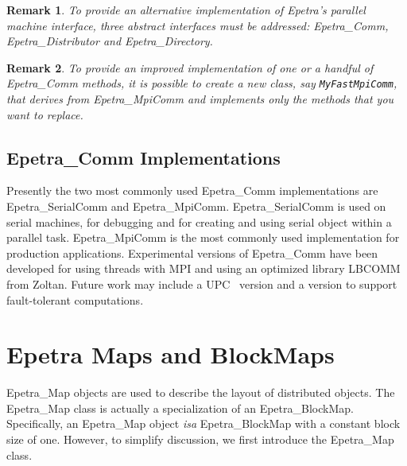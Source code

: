 \documentclass[12pt,relax]{EpetraUserGuide}
\newcommand{\comm}{Epetra\_Comm}
\newcommand{\serialcomm}{Epetra\_SerialComm}
\newcommand{\mpicomm}{Epetra\_MpiComm}
\newcommand{\map}{Epetra\_Map}
\newcommand{\blockmap}{Epetra\_BlockMap}
\newcommand{\distributor}{Epetra\_Distributor}
\newcommand{\directory}{Epetra\_Directory}
\newtheorem{remark}{Remark}
\begin{document}
\begin{remark}
To provide an alternative implementation of Epetra's parallel machine interface,  
three abstract interfaces must be addressed: \comm{}, \distributor{} and \directory.
\end{remark}

\begin{remark}
To provide an improved implementation of one or a handful of \comm{} methods,
it is possible to create a new class, say \verb!MyFastMpiComm!, that derives
from \mpicomm{} and implements only the methods that you want to replace.
\end{remark}

\subsection{\comm{} Implementations}

Presently the two most commonly used \comm{} implementations are \serialcomm{} 
and \mpicomm{}.  \serialcomm{} is used on serial machines, for debugging and for
creating and using serial object within a parallel task.  \mpicomm{} is the most
commonly used implementation for production applications.  Experimental versions
of \comm{} have been developed for using threads with MPI and using an optimized
library LBCOMM from Zoltan.  Future work may include a UPC~\cite{UPC} version and
a version to support fault-tolerant computations.

\section{Epetra Maps and BlockMaps}
\label{Section:maps}

\map{} objects are used to describe the layout of distributed
objects.  The \map{} class is actually a specialization of an
\blockmap{}.  Specifically, an \map{} object {\it isa} \blockmap{}
with a constant block size of one.  However, to simplify discussion,
we first introduce the \map{} class.
\end{document}
